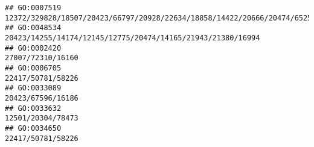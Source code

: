 \documentclass[
]{article}
\begin{document}
\begin{verbatim}
## GO:0007519                                                                                                                                                                                                                                                                                                                         12372/329828/18507/20423/66797/20928/22634/18858/14422/20666/20474/65256/17263/21380
## GO:0048534                                                                                                                                                                                                                                                                                                                                                  20423/14255/14174/12145/12775/20474/14165/21943/21380/16994
## GO:0002420                                                                                                                                                                                                                                                                                                                                                                                            27007/72310/16160
## GO:0006705                                                                                                                                                                                                                                                                                                                                                                                            22417/50781/58226
## GO:0033089                                                                                                                                                                                                                                                                                                                                                                                            20423/67596/16186
## GO:0033632                                                                                                                                                                                                                                                                                                                                                                                            12501/20304/78473
## GO:0034650                                                                                                                                                                                                                                                                                                                                                                                            22417/50781/58226

\end{verbatim}
\end{document}
